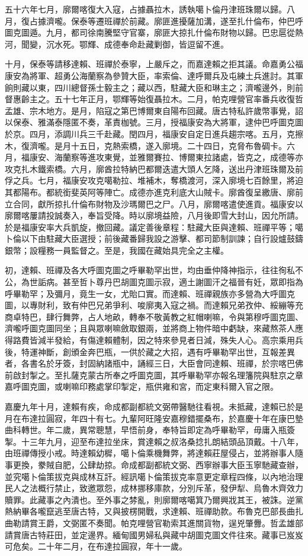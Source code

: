 \begin{pinyinscope}
五十六年七月，廓爾喀復大入寇，占據聶拉木，誘執噶卜倫丹津班珠爾以歸。八月，復占據濟嚨。保泰等遷班禪於前藏。廓匪進擾薩加溝，遂至扎什倫布，仲巴呼圖克圖遁。九月，都司徐南騰堅守官寨，廓匪大掠扎什倫布財物以歸。巴忠扈從熱河，聞變，沉水死。鄂輝、成德奉命赴藏剿御，皆逗留不進。

十月，保泰等請移達賴、班禪於泰寧，上嚴斥之，而嘉達賴之拒其議。命嘉勇公福康安為將軍、超勇公海蘭察為參贊大臣，率索倫、達呼爾兵及屯練土兵進討。其軍餉則藏以東，四川總督孫士毅主之；藏以西，駐藏大臣和琳主之；濟嚨邊外，則前督惠齡主之。五十七年正月，鄂輝等始復聶拉木。二月，帕克哩營官率番兵收復哲孟雄、宗木地方。是月，陷寇之第巴博爾東自陽布回藏。唐古特私許歲幣事覺，詔以保泰、雅滿泰隱匿不奏，革責枷號。三月，授福康安為大將軍，逮仲巴呼圖克圖於京。四月，添調川兵三千赴藏。閏四月，福康安自定日進兵趨宗喀。五月，克擦木，復濟嚨。是月十五日，克熱索橋，遂入廓境。二十四日，克脅布魯碉卡。六月，福康安、海蘭察等進攻東覺，並雅爾賽拉、博爾東拉諸處，皆克之，成德等亦攻克扎木鐵索橋。六月，廓酋拉特納巴都爾迭遣大頭人乞降，送出丹津班珠爾及前俘之兵。七月，福康安攻克噶勒拉、堆補木，奪橋渡河，深入廓境七百餘里，將迫其都陽布。都統銜斐英阿等陣亡。成德亦進克利底大山賊卡。廓酋復呈繳唐、廓前立合同，獻所掠扎什倫布財物及沙瑪爾巴之尸。八月，廓爾喀遣使進貢。福康安以廓爾喀屢請投誠奏入，奉旨受降。時以廓境益險，八月後即雪大封山，因允所請。於是福康安率大兵凱旋，撤回藏。議定善後章程：駐藏大臣與達賴、班禪平等；噶卜倫以下由駐藏大臣選授；前後藏番歸我設之游擊、都司節制訓諫；自行設爐鼓鑄銀幣；設糧務一員監督之。至是，我國在藏始具完全之主權。

初，達賴、班禪及各大呼圖克圖之呼畢勒罕出世，均由垂仲降神指示，往往徇私不公，為世詬病。甚至哲卜尊丹巴胡圖克圖示寂，適土謝圖汗之福晉有妊，眾即指為呼畢勒罕；及彌月，竟生一女，尤貽口實。而達賴、班禪親族亦多營為大呼圖克圖，以專財利，致有仲巴兄弟爭利、唆廓夷入寇之禍。而達賴兄弟孜仲、綏繃等充商卓特巴，肆行舞弊，占人地畝，轉奉不敬黃教之紅帽喇嘛，令與第穆呼圖克圖、濟嚨呼圖克圖同坐；且與眾喇嘛斂取銀兩，並將商上物件暗中虧缺，來藏熬茶人應得路費皆減半發給，有傷達賴體制，因之特來參見者日減，殊失人心。高宗乘用兵後，特運神斷，創頒金奔巴瓶，一供於藏之大招，遇有呼畢勒罕出世，互報差異者，各書名於牙簽，封固納諸瓶中，誦經三日，大臣會同達賴、班禪，於宗喀巴佛前啟封掣之。至扎薩克蒙古所奉之呼圖克圖，其呼畢勒罕亦報名理籓院與駐京之章嘉呼圖克圖，或喇嘛印務處掌印掣定，瓶供雍和宮，而定東科爾入官之限。

嘉慶九年十月，達賴有疾，命成都副都統文弼帶醫馳往看視。未抵藏，達賴已於是月在布達拉圓寂，年四十有七。九輩阿旺隆安嘉穆錯擺桑布，於嘉慶十年在康巴墊曲科轉世。年二歲，異常聰慧，早悟前身，奉特旨即定為呼畢勒罕，毋庸入瓶簽掣。十三年九月，迎至布達拉坐床，賞達賴之叔洛桑捻扎朗結頭品頂戴。十八年，由班禪傳授小戒。時達賴幼穉，噶卜倫乘機舞弊，將達賴莊屋侵占，並將辦事人隨事更換，豢賊自肥，公肆劫掠。命成都副都統文弼、西寧辦事大臣玉寧馳藏查辦，並究噶卜倫策拔克與成林互訐。經訊噶卜倫策拔克率意更定章程四條，以內地治理民人之法概行禁止，致邀眾怨，成林挪移庫款，分別斥革，發伊犁、烏魯木齊效力贖罪。此藏事之內潰也。至外事之棼亂，則廓爾喀噶箕乃爾興戕其王，被誅。逆黨熱納畢各嚨竄逃至唐古特，又與披楞開戰，求達賴、班禪助款。布魯克巴部長曲扎曲勒請賞王爵，文弼匿不奏聞。帕克哩營官勒索其進關貨物，逞兇肇釁。哲孟雄部請賞唐古特莊田，並定邊界。緬甸國男婦私與藏中胡圖克圖文件往來。藏事已岌岌可危矣。二十年二月，在布達拉圓寂，年十一歲。


\end{pinyinscope}

